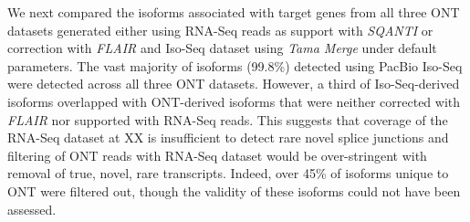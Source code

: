 We next compared the isoforms associated with target genes from all three ONT datasets generated either using RNA-Seq reads as support with \textit{SQANTI} or correction with \textit{FLAIR} and Iso-Seq dataset using \textit{Tama Merge} under default parameters. The vast majority of isoforms (99.8\%) detected using PacBio Iso-Seq were detected across all three ONT datasets. However, a third of Iso-Seq-derived isoforms overlapped with ONT-derived isoforms that were neither corrected with \textit{FLAIR} nor supported with RNA-Seq reads. This suggests that coverage of the RNA-Seq dataset at XX is insufficient to detect rare novel splice junctions and filtering of ONT reads with RNA-Seq dataset would be over-stringent with removal of true, novel, rare transcripts. Indeed, over 45\% of isoforms unique to ONT were filtered out, though the validity of these isoforms could not have been assessed. 

